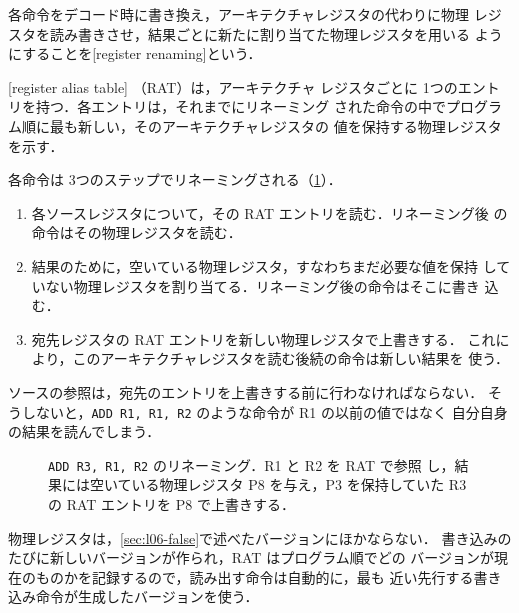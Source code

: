 \documentclass[../main.tex]{subfiles}
\begin{document}
\begin{definition}[レジスタリネーミング]
  \label{def:l06-renaming}
  各命令をデコード時に書き換え，アーキテクチャレジスタの代わりに物理
  レジスタを読み書きさせ，結果ごとに新たに割り当てた物理レジスタを用いる
  ようにすることを[register
  renaming]という．
\end{definition}

\begin{definition}[レジスタエイリアステーブル]
  \label{def:l06-rat}
  [register alias table]%
  （RAT）は，アーキテクチャ
  レジスタごとに 1つのエントリを持つ．各エントリは，それまでにリネーミング
  された命令の中でプログラム順に最も新しい，そのアーキテクチャレジスタの
  値を保持する物理レジスタを示す．
\end{definition}

各命令は 3つのステップでリネーミングされる（\cref{fig:l06-rat}）．%
\begin{enumerate}
  \item 各ソースレジスタについて，その RAT エントリを読む．リネーミング後
    の命令はその物理レジスタを読む．
  \item 結果のために，空いている物理レジスタ，すなわちまだ必要な値を保持
    していない物理レジスタを割り当てる．リネーミング後の命令はそこに書き
    込む．
  \item 宛先レジスタの RAT エントリを新しい物理レジスタで上書きする．
    これにより，このアーキテクチャレジスタを読む後続の命令は新しい結果を
    使う．
\end{enumerate}
ソースの参照は，宛先のエントリを上書きする前に行わなければならない．
そうしないと，\texttt{ADD R1, R1, R2} のような命令が R1 の以前の値ではなく
自分自身の結果を読んでしまう．

\begin{figure}[htbp]
  \centering
  
  \caption{\texttt{ADD R3, R1, R2} のリネーミング．R1 と R2 を RAT で参照
    し，結果には空いている物理レジスタ P8 を与え，P3 を保持していた R3 の
    RAT エントリを P8 で上書きする．}
  \label{fig:l06-rat}
\end{figure}

物理レジスタは，\cref{sec:l06-false}で述べたバージョンにほかならない．
書き込みのたびに新しいバージョンが作られ，RAT はプログラム順でどの
バージョンが現在のものかを記録するので，読み出す命令は自動的に，最も
近い先行する書き込み命令が生成したバージョンを使う．%
\end{document}
